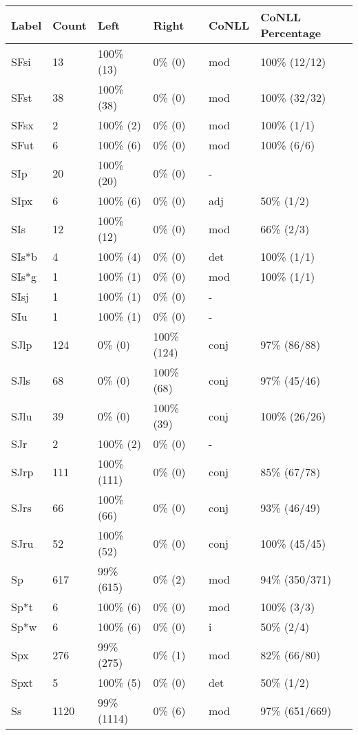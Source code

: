 \begin{figure*}
\begin{tabular}{|l|l|l|l||l|l|}
\hline
Label & Count & Left & Right & CoNLL & CoNLL Percentage\\ 
\hline
 SFsi & 13 & 100\% (13) & 0\% (0) & mod & 100\% (12/12) \\ 
\hline
 SFst & 38 & 100\% (38) & 0\% (0) & mod & 100\% (32/32) \\ 
\hline
 SFsx & 2 & 100\% (2) & 0\% (0) & mod & 100\% (1/1) \\ 
\hline
 SFut & 6 & 100\% (6) & 0\% (0) & mod & 100\% (6/6) \\ 
\hline
 SIp & 20 & 100\% (20) & 0\% (0) & - &  \\ 
\hline
 SIpx & 6 & 100\% (6) & 0\% (0) & adj & 50\% (1/2) \\ 
\hline
 SIs & 12 & 100\% (12) & 0\% (0) & mod & 66\% (2/3) \\ 
\hline
 SIs*b & 4 & 100\% (4) & 0\% (0) & det & 100\% (1/1) \\ 
\hline
 SIs*g & 1 & 100\% (1) & 0\% (0) & mod & 100\% (1/1) \\ 
\hline
 SIsj & 1 & 100\% (1) & 0\% (0) & - &  \\ 
\hline
 SIu & 1 & 100\% (1) & 0\% (0) & - &  \\ 
\hline
 SJlp & 124 & 0\% (0) & 100\% (124) & conj & 97\% (86/88) \\ 
\hline
 SJls & 68 & 0\% (0) & 100\% (68) & conj & 97\% (45/46) \\ 
\hline
 SJlu & 39 & 0\% (0) & 100\% (39) & conj & 100\% (26/26) \\ 
\hline
 SJr & 2 & 100\% (2) & 0\% (0) & - &  \\ 
\hline
 SJrp & 111 & 100\% (111) & 0\% (0) & conj & 85\% (67/78) \\ 
\hline
 SJrs & 66 & 100\% (66) & 0\% (0) & conj & 93\% (46/49) \\ 
\hline
 SJru & 52 & 100\% (52) & 0\% (0) & conj & 100\% (45/45) \\ 
\hline
 Sp & 617 & 99\% (615) & 0\% (2) & mod & 94\% (350/371) \\ 
\hline
 Sp*t & 6 & 100\% (6) & 0\% (0) & mod & 100\% (3/3) \\ 
\hline
 Sp*w & 6 & 100\% (6) & 0\% (0) & i & 50\% (2/4) \\ 
\hline
 Spx & 276 & 99\% (275) & 0\% (1) & mod & 82\% (66/80) \\ 
\hline
 Spxt & 5 & 100\% (5) & 0\% (0) & det & 50\% (1/2) \\ 
\hline
 Ss & 1120 & 99\% (1114) & 0\% (6) & mod & 97\% (651/669) \\ 

\end{tabular}
\end{figure*}
